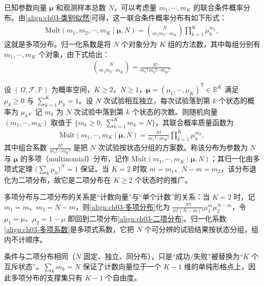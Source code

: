 \documentclass[../../main.tex]{subfiles}
\begin{document}
已知参数向量 $\boldsymbol{\mu}$ 和观测样本总数 $N$，可以考虑量 $m_1,\cdots,m_K$ 的联合条件概率分布。由\eqref{align:ch03-类别似然}可得，这一联合条件概率分布有如下形式：
\begin{align}
\mathrm{Mult}(m_1,m_2,\cdots,m_K\mid\boldsymbol{\mu},N)=\binom{N}{m_1m_2\cdots m_K}\prod_{k=1}^{K}\mu_k^{m_k},
\label{align:ch03-多项分布}
\end{align}
这就是多项分布。归一化系数是将 $N$ 个对象分为 $K$ 组的方法数，其中每组分别有 $m_1,\cdots,m_K$ 个对象，由下式给出：
\begin{align}
\binom{N}{m_1m_2\cdots m_K}=\frac{N!}{m_1!\,m_2!\cdots m_K!}.
\label{align:ch03-多项系数}
\end{align}

\begin{definition}[多项分布]\label{definition:ch03-多项分布}
设 $(\Omega,\mathcal{F},\mathbb{P})$ 为概率空间，$K\geqslant2$，$N\geqslant1$，$\boldsymbol{\mu}=(\mu_1,\cdots,\mu_K)^{\mathsf{T}}\in\mathbb{R}^{K}$ 满足 $\mu_k\geqslant0$ 与 $\sum_{k=1}^{K}\mu_k=1$。设 $N$ 次试验相互独立，每次试验落到第 $k$ 个状态的概率为 $\mu_k$，记 $m_k$ 为 $N$ 次试验中落到第 $k$ 个状态的次数。则随机向量 $(m_1,\cdots,m_K)$ 取值于 $\{m_k\geqslant0,\ \sum_{k=1}^{K}m_k=N\}$，其联合概率质量函数为
\begin{align*}
\mathrm{Mult}(m_1,\cdots,m_K\mid\boldsymbol{\mu},N)=\frac{N!}{m_1!\cdots m_K!}\prod_{k=1}^{K}\mu_k^{m_k},
\end{align*}
其中组合系数 $\frac{N!}{m_1!\cdots m_K!}$ 是把 $N$ 次试验按状态分组的方案数。称该分布为参数为 $N$ 与 $\boldsymbol{\mu}$ 的多项（multinomial）分布，记作 $\mathrm{Mult}(m_1,\cdots,m_K\mid\boldsymbol{\mu},N)$；其归一化由多项式定理 $\bigl(\sum_k\mu_k\bigr)^{N}=1$ 保证。当 $K=2$ 时取 $m=m_1$、$N-m=m_2$，该分布退化为二项分布，故它是二项分布在 $K\geqslant2$ 个状态时的推广。
\end{definition}

\begin{remark}
多项分布与二项分布的关系是“计数向量”与“单个计数”的关系：当 $K=2$ 时，记 $m_1=m$、$m_2=N-m$，则\eqref{align:ch03-多项分布}化为 $\frac{N!}{m!(N-m)!}\mu_1^{m}\mu_2^{N-m}$，令 $\mu_1=\mu$、$\mu_2=1-\mu$ 即回到二项分布\eqref{align:ch03-二项分布}。归一化系数\eqref{align:ch03-多项系数}是多项式系数，它把 $N$ 个可分辨的试验结果按状态分组，组内不计顺序。

条件与二项分布相同（$N$ 固定、独立、同分布），只是“成功/失败”被替换为“$K$ 个互斥状态”。$\sum_k m_k=N$ 保证了计数向量位于一个 $K-1$ 维的单纯形格点上，因此多项分布的支撑集只有 $K-1$ 个自由度。
\end{remark}
\end{document}

